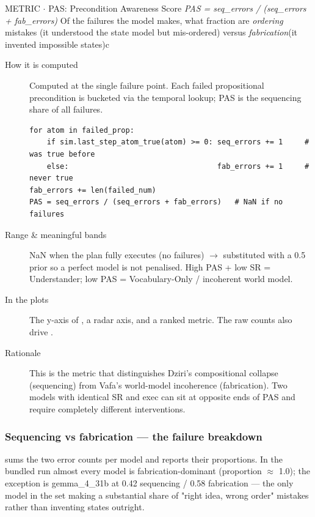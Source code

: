 \begin{bmmcard}{METRIC \(\cdot\) PAS: Precondition Awareness Score}
\emph{PAS = seq\_errors / (seq\_errors + fab\_errors)}
Of the failures the model makes, what fraction are \emph{ordering} mistakes (it understood the state model but mis-ordered) versus \emph{fabrication}(it invented impossible states)c
\begin{description}
\item[How it is computed] Computed at the single failure point. Each failed propositional precondition is bucketed via the temporal lookup; PAS is the sequencing share of all failures.

\begin{lstlisting}
for atom in failed_prop:
    if sim.last_step_atom_true(atom) >= 0: seq_errors += 1     # was true before
    else:                                  fab_errors += 1     # never true
fab_errors += len(failed_num)
PAS = seq_errors / (seq_errors + fab_errors)   # NaN if no failures
\end{lstlisting}
\item[Range \& meaningful bands] NaN when the plan fully executes (no failures) \(\rightarrow\) substituted with a 0.5 prior so a perfect model is not penalised. High PAS + low SR = Understander; low PAS = Vocabulary-Only / incoherent world model.
\item[In the plots] The y-axis of , a radar axis, and a ranked metric. The raw counts also drive .
\item[Rationale] This is the metric that distinguishes Dziri's compositional collapse (sequencing) from Vafa's world-model incoherence (fabrication). Two models with identical SR and exec can sit at opposite ends of PAS and require completely different interventions.
\end{description}
\end{bmmcard}

\subsubsection{Sequencing vs fabrication --- the failure breakdown}

 sums the two error counts per model and reports their proportions. In the bundled run almost every model is fabrication-dominant (proportion \(\approx\) 1.0); the exception is gemma\_4\_31b at 0.42 sequencing / 0.58 fabrication --- the only model in the set making a substantial share of "right idea, wrong order" mistakes rather than inventing states outright.

